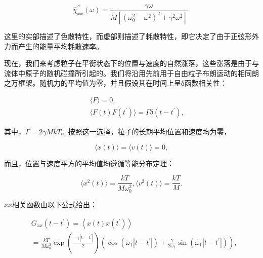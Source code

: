 \begin{equation}\tag{15.3.43}\label{eq:15.3.43}
\hat { \chi } _ { x x } ^{\prime \prime} ( \omega ) = \frac { \gamma \omega } { M [ ( \omega _ { 0 } ^{2} - \omega ^{2} ) ^{2} + \gamma ^{2} \omega ^{2} ] } .
\end{equation}

这里的实部描述了色散特性，而虚部则描述了耗散特性，即它决定了由于正弦形外力而产生的能量平均耗散速率。

现在，我们来考虑粒子在平衡状态下的位置与速度的自然涨落，这些涨落是由于与流体中原子的随机碰撞所引起的。我们将沿用先前用于自由粒子布朗运动的相同朗之万框架。随机力的平均值为零，并且假设其在时间上呈δ函数相关性：

\begin{equation}\tag{15.3.44}\label{eq:15.3.44}
\begin{array}{rlr} & { } & { \langle F \rangle = 0 , } \\& { } & { \langle F ( t ) F ( t ^{\prime} ) \rangle = \Gamma \delta ( t - t ^{\prime} ) , } \end{array}
\end{equation}

其中，\(\Gamma = 2\gamma MkT\)。按照这一选择，粒子的长期平均位置和速度均为零，

\begin{equation}\tag{15.3.45}\label{eq:15.3.45}
\langle x ( t ) \rangle = \langle v ( t ) \rangle = 0 ,
\end{equation}

而且，位置与速度平方的平均值均遵循等能分布定理：

\begin{equation}\tag{15.3.46}\label{eq:15.3.46}
\langle x ^{2} ( t ) \rangle = \frac { k T } { M \omega _ { 0 } ^{2} } ,  \langle v ^{2} ( t ) \rangle = \frac { k T } { M } .
\end{equation}

\(xx\)相关函数由以下公式给出：

\begin{equation}\tag{15.3.47}\label{eq:15.3.47}
\begin{array}{rl} & { G _ { x x } ( t - t ^{\prime} ) = \left\langle x ( t ) x ( t ^{\prime} ) \right\rangle } \\& {  = \frac { k T } { M \omega _ { 0 } ^{2} } \exp \left( \frac { - \gamma | t - t ^{\prime} | } { 2 } \right) \left( \cos \left( \omega _ { 1 } | t - t ^{\prime} | \right) + \frac { \gamma } { 2 \omega _ { 1 } } \sin \left( \omega _ { 1 } | t - t ^{\prime} | \right) \right) , } \end{array}
\end{equation}

